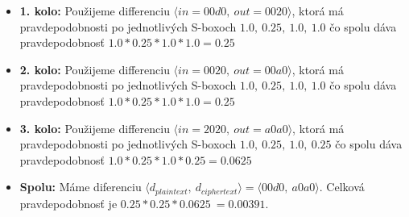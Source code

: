 \begin{itemize}
\item {\bf 1. kolo:}
Použijeme differenciu $\langle in= 00d0 ,\ out= 0020 \rangle $,
ktorá má pravdepodobnosti po jednotlivých S-boxoch $
1.0,\ 0.25,\ 1.0,\ 1.0
$ čo spolu dáva pravdepodobnosť 
$ 1.0*0.25*1.0*1.0 = 0.25 $

\item {\bf 2. kolo:}
Použijeme differenciu $\langle in= 0020 ,\ out= 00a0 \rangle $,
ktorá má pravdepodobnosti po jednotlivých S-boxoch $
1.0,\ 0.25,\ 1.0,\ 1.0
$ čo spolu dáva pravdepodobnosť 
$ 1.0*0.25*1.0*1.0 = 0.25 $

\item {\bf 3. kolo:}
Použijeme differenciu $\langle in= 2020 ,\ out= a0a0 \rangle $,
ktorá má pravdepodobnosti po jednotlivých S-boxoch $
1.0,\ 0.25,\ 1.0,\ 0.25
$ čo spolu dáva pravdepodobnosť 
$ 1.0*0.25*1.0*0.25 = 0.0625 $

\item {\bf Spolu:}  Máme diferenciu $\langle d_{plaintext},\  d_{ciphertext} \rangle = \langle 00d0 ,\  a0a0 \rangle$.
Celková pravdepodobnosť je $ 0.25*0.25*0.0625 ~= 0.00391 $.
\end{itemize}
